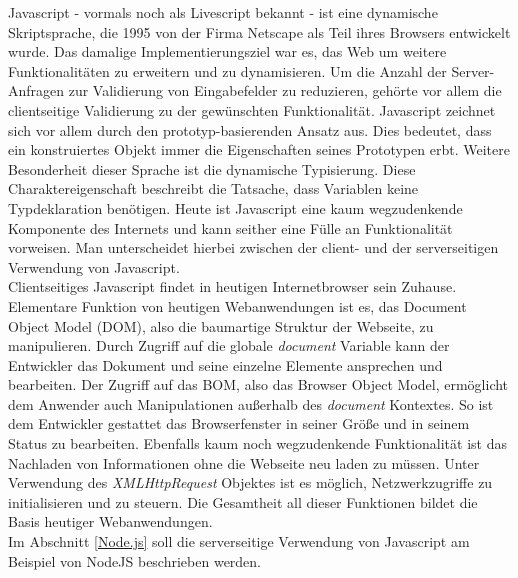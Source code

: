 Javascript - vormals noch als Livescript bekannt -  ist eine dynamische Skriptsprache, die 1995 von der Firma Netscape als Teil ihres Browsers entwickelt wurde. Das damalige Implementierungsziel war es, das Web um weitere Funktionalitäten zu erweitern und zu dynamisieren. Um die Anzahl der Server-Anfragen zur Validierung von Eingabefelder zu reduzieren, gehörte vor allem die clientseitige Validierung zu der gewünschten Funktionalität.
Javascript zeichnet sich vor allem durch den prototyp-basierenden Ansatz aus. Dies bedeutet, dass ein konstruiertes Objekt immer die Eigenschaften seines Prototypen erbt. Weitere Besonderheit dieser Sprache ist die dynamische Typisierung. Diese Charaktereigenschaft beschreibt die Tatsache, dass Variablen keine Typdeklaration benötigen. Heute ist Javascript eine kaum wegzudenkende Komponente des Internets und kann seither eine Fülle an Funktionalität vorweisen. Man unterscheidet hierbei zwischen der client- und der serverseitigen Verwendung von Javascript.\\
Clientseitiges Javascript findet in heutigen Internetbrowser sein Zuhause. Elementare Funktion von heutigen Webanwendungen ist es, das Document Object Model (DOM), also die baumartige Struktur der Webseite, zu manipulieren. Durch Zugriff auf die globale \textit{document} Variable kann der Entwickler das Dokument und seine einzelne Elemente ansprechen und bearbeiten. Der Zugriff auf das BOM, also das Browser Object Model, ermöglicht dem Anwender auch Manipulationen außerhalb des \textit{document} Kontextes. So ist dem Entwickler gestattet das Browserfenster in seiner Größe und in seinem Status zu  bearbeiten. Ebenfalls kaum noch wegzudenkende Funktionalität ist das Nachladen von Informationen ohne die Webseite neu laden zu müssen. Unter Verwendung des \textit{XMLHttpRequest} Objektes ist es möglich, Netzwerkzugriffe zu initialisieren und zu steuern. Die Gesamtheit all dieser Funktionen bildet die Basis heutiger Webanwendungen. \\
Im  Abschnitt \ref{Node.js} soll die serverseitige Verwendung von Javascript am Beispiel von NodeJS beschrieben werden. 
